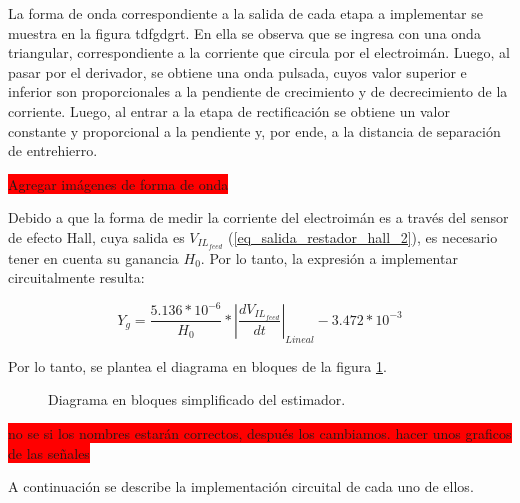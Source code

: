 La forma de onda correspondiente a la salida de cada etapa a implementar se muestra en la figura tdfgdgrt. En ella se observa que se ingresa con una onda triangular, correspondiente a la corriente que circula por el electroimán. Luego, al pasar por el derivador, se obtiene una onda pulsada, cuyos valor superior e inferior son proporcionales a la pendiente de crecimiento y de decrecimiento de la corriente. Luego, al entrar a la etapa de rectificación se obtiene un valor constante y proporcional a la pendiente y, por ende, a la distancia de separación de entrehierro.


\colorbox{red}{Agregar imágenes de forma de onda}

Debido a que la forma de medir la corriente del electroimán es a través del sensor de efecto Hall, cuya salida es $V_{IL_{feed}}$ (\ref{eq_salida_restador_hall_2}), es necesario tener en cuenta su ganancia $H_0$. Por lo tanto, la expresión a implementar circuitalmente resulta:

\begin{equation} \label{eq_Yg_salida_sensor}
	Y_g=\frac{5.136*10^{-6}}{H_0}*{\left|\frac{dV_{IL_{feed}}}{dt}\right|}_{Lineal} - 3.472*10^{-3}
\end{equation}


Por lo tanto, se plantea el diagrama en bloques de la figura \ref{fig:img_diag-en-bloques_estimador}.

\begin{figure}[H]
	\centering
	
	\caption{Diagrama en bloques simplificado del estimador.}	\label{fig:img_diag-en-bloques_estimador}
\end{figure}
\colorbox{red}{no se si los nombres estarán correctos, después los cambiamos. hacer unos graficos de las señales}

A continuación se describe la implementación circuital de cada uno de ellos.

{
	
}


